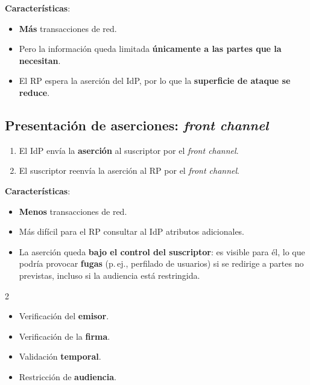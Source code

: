 \documentclass[11pt,a4paper]{report}
\begin{document}
\textbf{Características}:
\begin{itemize}
  \item \textbf{Más} transacciones de red.
  \item Pero la información queda limitada \textbf{únicamente a las partes que la necesitan}.
  \item El RP espera la aserción del IdP, por lo que la \textbf{superficie de ataque se reduce}.
\end{itemize}
 
\subsection{Presentación de aserciones: \emph{front channel}}
 
\begin{center}
\end{center}
 
\begin{enumerate}
  \item El IdP envía la \textbf{aserción} al suscriptor por el \emph{front channel}.
  \item El suscriptor reenvía la aserción al RP por el \emph{front channel}.
\end{enumerate}
 
\textbf{Características}:
\begin{itemize}
  \item \textbf{Menos} transacciones de red.
  \item Más difícil para el RP consultar al IdP atributos adicionales.
  \item La aserción queda \textbf{bajo el control del suscriptor}: es visible para él, lo que podría provocar \textbf{fugas} (p.\,ej., perfilado de usuarios) si se redirige a partes no previstas, incluso si la audiencia está restringida.
\end{itemize}
 
\begin{importante}[title={En ambos casos, la aserción debe validarse}]
\begin{multicols}{2}
\begin{itemize}
  \item Verificación del \textbf{emisor}.
  \item Verificación de la \textbf{firma}.
  \item Validación \textbf{temporal}.
  \item Restricción de \textbf{audiencia}.
\end{itemize}
\end{multicols}
\end{importante}
 
\end{document}
